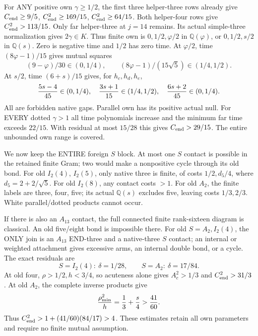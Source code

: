 \documentclass[11pt]{article}
\begin{document}
For ANY positive own \(\gamma\ge1/2\),
the first three helper-three rows already
give \(C_{\rm end}\ge9/5\),
\(C_{\rm end}^2\ge169/15\),
\(C_{\rm end}^2\ge64/15\).
Both helper-four rows give
\(C_{\rm end}^2>113/15\).
Only far helper-three at \(j=14\) remains.
Its actual simple-three normalization gives
\(2\gamma\in K\).
Thus finite own is
\(0,1/2,\varphi/2\) in \(\mathbb Q(\varphi)\),
or \(0,1/2,s/2\) in \(\mathbb Q(s)\).
Zero is negative time and \(1/2\) has zero
time.  At \(\varphi/2\), time
\((8\varphi-1)/15\) gives mutual squares
\[
        (9-\varphi)/30\in(0,1/4),\qquad
       (8\varphi-1)/(15\sqrt5)\in(1/4,1/2) .
\]
At \(s/2\), time \((6+s)/15\) gives,
for \(h_c,h_d,h_e\),
\[
 {5s-4\over45}\in(0,1/4),\quad
 {3s+1\over15}\in(1/4,1/2),\quad
 {6s+2\over45}\in(0,1/4) .
\]
All are forbidden native gaps.
Parallel own has its positive actual null.
For EVERY dotted \(\gamma>1\) all time
polynomials increase and the minimum far
time exceeds \(22/15\).
With residual at most \(15/28\) this gives
\(C_{\rm end}>29/15\).
The entire unbounded own range is covered.

We now keep the ENTIRE foreign \(S\) block.
At most one \(S\) contact is possible in
the retained finite Gram; two would make
a nonpositive cycle through its old bond.
For old \(I_2(4)\), \(I_2(5)\), only native
three is finite, of costs \(1/2,d_5/4\),
where \(d_5=2+2/\sqrt5\).
For old \(I_2(8)\), any contact costs \(>1\).
For old \(A_2\), the finite labels are
three, four, five; its actual \(\mathbb Q(s)\)
excludes five, leaving costs \(1/3,2/3\).
White parallel/dotted products cannot occur.

If there is also an \(A_{13}\) contact,
the full connected finite rank-sixteen
diagram is classical.
An old five/eight bond is impossible there.
For old \(S=A_2,I_2(4)\), the ONLY join is
an \(A_{13}\) END-three and a native-three
\(S\) contact; an internal or weighted
attachment gives excessive arms, an internal
double bond, or a cycle.
The exact residuals are
\[
                    S=I_2(4):\ \delta=1/28,\qquad
                    S=A_2:\ \delta=17/84 .
\]
At old four, \(\rho>1/2,h<3/4\), so
acuteness alone gives \(A_c^2>1/3\) and
\(C_{\rm end}^2>31/3\).
At old \(A_2\), the complete inverse products
give
\[
                   {\rho_{\min}^2\over h}
                       ={1\over3}+{s\over4}>{41\over60}.
\]
Thus \(C_{\rm end}^2>1+(41/60)(84/17)>4\).
These estimates retain all own parameters
and require no finite mutual assumption.
\end{document}
